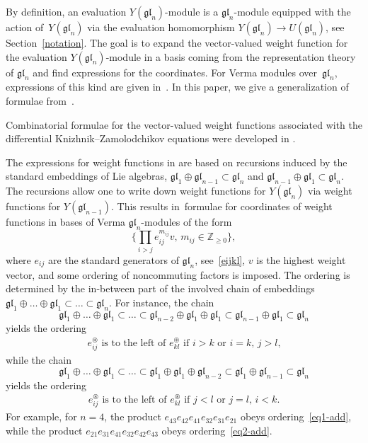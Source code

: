 \documentclass[10pt,a4paper]{amsart}
\numberwithin{equation}{section}
\begin{document}
By definition, an evaluation $Y(\mathfrak{gl}_n)$-module is a $\mathfrak{gl}_n$-module
equipped with the action of~$Y(\mathfrak{gl}_n)$ via the evaluation homomorphism
$Y(\mathfrak{gl}_n)\rightarrow U(\mathfrak{gl}_n)$, see Section~\ref{notation}. The goal is
to expand the vector-valued weight function for the evaluation $Y(\mathfrak{gl}_n)$-module
in a basis coming from the representation theory of $\mathfrak{gl}_n$ and find expressions
for the coordinates. For Verma modules over~$\mathfrak{gl}_n$, expressions of this kind are given
in~\cite{TVC}. In this paper, we give a generalization of formulae from~\cite{TVC}.

Combinatorial formulae for the vector-valued weight functions associated with the differential
Knizhnik--Zamolodchikov equations were developed in \cite{FRV,MV, M,RSV,SV1,SV2}.

The expressions for weight functions in \cite{TVC} are based on recursions
induced by the standard embeddings of Lie algebras,
$\mathfrak{gl}_1\oplus \mathfrak{gl}_{n-1}\subset \mathfrak{gl}_n$ and
$\mathfrak{gl}_{n-1}\oplus \mathfrak{gl}_1 \subset \mathfrak{gl}_n$. The recursions
allow one to write down weight functions for $Y(\mathfrak{gl}_n)$ via weight functions for
$Y(\mathfrak{gl}_{n-1})$. This results in~formulae for coordinates of weight functions in bases
of Verma $\mathfrak{gl}_n$-modules of the form
\begin{equation}\label{basis}
\biggl\{ \prod_{i>j} e_{ij}^{m_{ij}}v, \,
m_{ij}\in\mathbb{Z}_{\geq0}\biggr\},
\end{equation}
where $e_{ij}$ are the standard generators of $\mathfrak{gl}_n$, see~\eqref{eijkl},
$v$ is the highest weight
vector, and some ordering of noncommuting factors is imposed. The ordering is determined
by the in-between part of the involved chain of embeddings
$\mathfrak{gl}_1 \oplus\dots\oplus \mathfrak{gl}_1\subset\dots\subset\mathfrak{gl}_n$.
For instance, the chain
\[\mathfrak{gl}_1 \oplus\dots\oplus \mathfrak{gl}_1\subset
\dots\subset\mathfrak{gl}_{n-2}\oplus \mathfrak{gl}_1 \oplus \mathfrak{gl}_1 \subset
\mathfrak{gl}_{n-1}\oplus \mathfrak{gl}_1 \subset \mathfrak{gl}_n
\]
yields the ordering
\begin{gather}\label{eq1-add}
\text{$e_{ij}^\circledast$ is to the left of $e_{kl}^\circledast$ if $i>k$ or $i=k$, $j>l$,}
\end{gather}
while the chain
\[
\mathfrak{gl}_1 \oplus\dots\oplus \mathfrak{gl}_1
\subset\dots\subset\mathfrak{gl}_1 \oplus \mathfrak{gl}_1\oplus\mathfrak{gl}_{n-2} \subset
\mathfrak{gl}_1\oplus \mathfrak{gl}_{n-1}\subset \mathfrak{gl}_n
\]
yields the ordering
\begin{gather}\label{eq2-add}
\text{$e_{ij}^\circledast$ is to the left of $e_{kl}^\circledast$ if $j<l$ or $j=l$, $i<k$.}
\end{gather}
For example, for $n=4$, the product $e_{43}e_{42}e_{41}e_{32}e_{31}e_{21}$ obeys ordering~\eqref{eq1-add}, while the product $e_{21}e_{31}e_{41}e_{32}e_{42}e_{43}$ obeys ordering~\eqref{eq2-add}.
\end{document}
